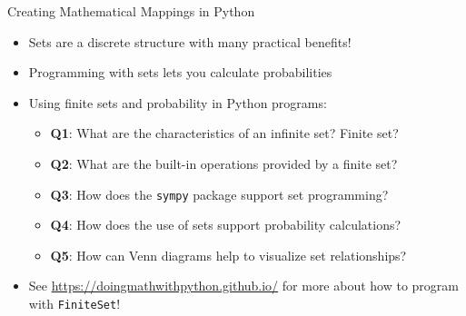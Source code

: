 \documentclass[14pt,aspectratio=169]{beamer}
\begin{document}
%
\begin{frame}{Creating Mathematical Mappings in Python}
  \begin{itemize}
    \item Sets are a discrete structure with many practical benefits!
      \vspace*{-.2in}
    \item Programming with sets lets you calculate probabilities
      \vspace*{-.2in}
    \item Using finite sets and probability in Python programs:
      \begin{itemize}
        \item {\bf Q1}: What are the characteristics of an infinite set? Finite set?
        \item {\bf Q2}: What are the built-in operations provided by a finite set?
        \item {\bf Q3}: How does the {\tt sympy} package support set
          programming?
        \item {\bf Q4}: How does the use of sets support probability
          calculations?
        \item {\bf Q5}: How can Venn diagrams help to visualize set
          relationships?
      \end{itemize}
      \vspace*{-.2in}
    \item See \url{https://doingmathwithpython.github.io/} for more about how to
      program with {\tt FiniteSet}!
  \end{itemize}
\end{frame}
\end{document}
